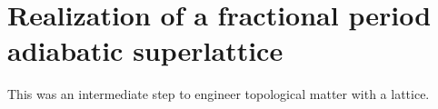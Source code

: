 
\renewcommand{\thechapter}{9}

\chapter{Realization of a fractional period adiabatic superlattice}
\label{ch:raman_lattice}

This was an intermediate step to engineer topological matter with a lattice. 